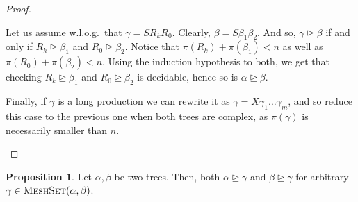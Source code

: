 \documentclass[11pt,a4paper]{amsart}
\theoremstyle{definition}
\newtheorem{prop}[theorem]{Proposition}
\newcommand{\MeshSet}[2]{\textsc{MeshSet}(#1,#2)}
\newcommand{\potential}[1]{\pi(#1)}
\begin{document}
\begin{proof}
\begin{enumerate}[(i)]
                   Let us assume w.l.o.g.~that $\gamma = S R_k R_0$. Clearly,
                   $\beta = S \beta_1 \beta_2$. And so, $\gamma \trianglerighteq
                   \beta$ if and only if $R_k \trianglerighteq \beta_1$ and $R_0
                   \trianglerighteq \beta_2$. Notice that $\potential{R_k} +
                   \potential{\beta_1} < n$ as well as $\potential{R_0} +
                   \potential{\beta_2} < n$. Using the induction hypothesis to
                   both, we get that checking $R_k \trianglerighteq \beta_1$ and
                   $R_0 \trianglerighteq \beta_2$ is decidable, hence so is $\alpha
                   \trianglerighteq \beta$.

                   Finally, if $\gamma$ is a long production we can rewrite it
                   as $\gamma = X \gamma_1 \ldots \gamma_m$, and so reduce this case to
                   the previous one when both trees are complex, as $\potential{\gamma}$ is necessarily smaller than $n$.
        \end{enumerate}
\end{proof}

\begin{prop}\label{prop-meshset-rewrites}
    Let $\alpha,\beta$ be two trees.  Then, both $\alpha \trianglerighteq
    \gamma$ and $\beta \trianglerighteq \gamma$ for arbitrary $\gamma \in
    \MeshSet{\alpha}{\beta}$.
\end{prop}
\end{document}
